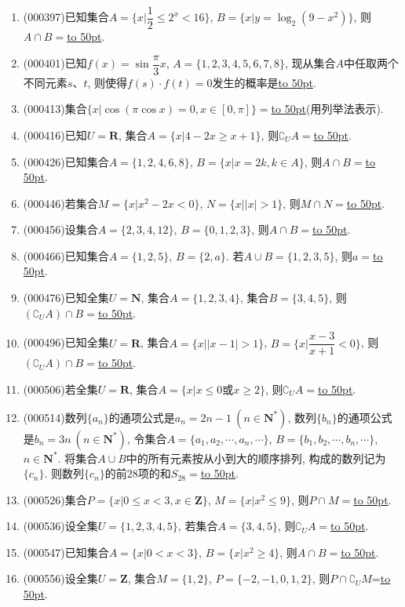 \documentclass[10pt,a4paper]{article}
\newcommand{\blank}[1]{\underline{\hbox to #1pt{}}}
\begin{document}
\begin{enumerate}[1.]
\item {\tiny (000397)}已知集合$A=\{x|\dfrac12\le {2^x}<16\}$, $B=\{x|y=\log _2(9-x^2)\}$, 则$A\cap B=$\blank{50}.
\item {\tiny (000401)}已知$f(x)=\sin\dfrac\pi 3x$, $A=\{1,2,3,4,5,6,7,8\}$, 现从集合$A$中任取两个不同元素$s$、$t$, 则使得$f(s)\cdot f(t)=0$发生的概率是\blank{50}.
\item {\tiny (000413)}集合$\{x|\cos (\pi \cos x)=0,x\in [0,\pi]\}=$\blank{50}(用列举法表示).
\item {\tiny (000416)}已知$U=\mathbf{R}$, 集合$A=\{x|4-2x\ge x+1\}$, 则${\complement_U}A=$\blank{50}.
\item {\tiny (000426)}已知集合$A=\{1,2,4,6,8\}$, $B=\{x|x=2k,k\in A\}$, 则$A\cap B=$\blank{50}.
\item {\tiny (000446)}若集合$M=\{x|{x^2}-2x<0\}$, $N=\{x||x|>1\}$, 则$M\cap N=$\blank{50}.
\item {\tiny (000456)}设集合$A=\{2,3,4,12\}$, $B=\{0,1,2,3\}$, 则$A\cap B=$\blank{50}.
\item {\tiny (000466)}已知集合$A=\{1,2,5\}$, $B=\{2,a\}$. 若$A\cup B=\{1,2,3,5\}$, 则$a=$\blank{50}.
\item {\tiny (000476)}已知全集$U=\mathbf{N}$, 集合$A=\{1,2,3,4\}$, 集合$B=\{3,4,5\}$, 则$(\complement_U A)\cap B=$\blank{50}.
\item {\tiny (000496)}已知全集$U=\mathbf{R}$, 集合$A=\{x||x-1|>1\}$, $B=\{x|\dfrac{x-3}{x+1}<0\}$, 则$(\complement_U A)\cap B=$\blank{50}.
\item {\tiny (000506)}若全集$U=\mathbf{R}$, 集合$A=\{x|x\le 0\text{或} x\ge 2\}$, 则$\complement_U A=$\blank{50}.
\item {\tiny (000514)}数列$\{a_n\}$的通项公式是$a_n=2n-1\ (n\in \mathbf{N}^*)$, 数列$\{b_n\}$的通项公式是$b_n=3n \ (n\in \mathbf{N}^*)$, 令集合$A=\{a_1,a_2,\cdots,a_n,\cdots\}$, $B=\{b_1,b_2,\cdots,b_n,\cdots\}$, $n\in \mathbf{N}^*$. 将集合$A\cup B$中的所有元素按从小到大的顺序排列, 构成的数列记为$\{c_n\}$. 则数列$\{c_n\}$的前$28$项的和$S_{28}=$\blank{50}.
\item {\tiny (000526)}集合$P=\{x|0 \le x<3, x\in \mathbf{Z}\}$, $M=\{x|x^2 \le 9\}$, 则$P\cap M=$\blank{50}.
\item {\tiny (000536)}设全集$U=\{ 1,2,3,4,5\}$, 若集合$A=\{3,4,5\}$, 则$\complement_U A=$\blank{50}.
\item {\tiny (000547)}已知集合$A=\{x|0<x<3\}$, $B=\{x|x^2\ge 4\}$, 则$A\cap B=$\blank{50}.
\item {\tiny (000556)}设全集$U=\mathbf{Z}$, 集合$M=\{1,2\}$, $P=\{-2,-1,0,1,2\}$, 则$P\cap \complement_U M$=\blank{50}.

\end{enumerate}
\end{document}
